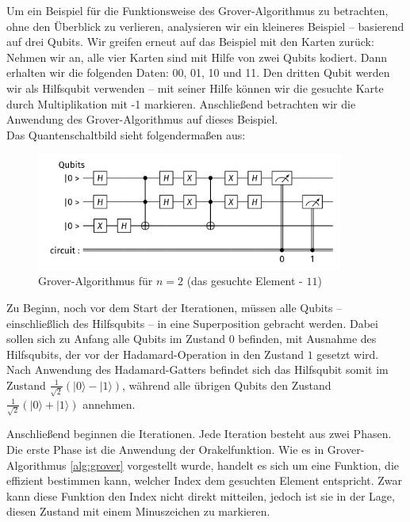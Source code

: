 Um ein Beispiel für die Funktionsweise des Grover-Algorithmus zu betrachten, ohne den Überblick zu verlieren, analysieren wir ein kleineres Beispiel – basierend auf drei Qubits. Wir greifen erneut auf das Beispiel mit den Karten zurück: Nehmen wir an, alle vier Karten sind mit Hilfe von zwei Qubits kodiert. Dann erhalten wir die folgenden Daten: 00, 01, 10 und 11. Den dritten Qubit werden wir als Hilfsqubit  verwenden – mit seiner Hilfe können wir die gesuchte Karte durch Multiplikation mit -1 markieren. Anschließend betrachten wir die Anwendung des Grover-Algorithmus auf dieses Beispiel.\\

Das Quantenschaltbild sieht folgendermaßen aus:
\begin{figure}[h!]
    \centering
    \includegraphics[width=0.9\textwidth]{images/basic-algorithms/3-qubits-grover.png}
    \caption{Grover-Algorithmus für $n=2$ (das gesuchte Element - $11$)}
    \label{fig:grover-three-bits}
\end{figure}

Zu Beginn, noch vor dem Start der Iterationen, müssen alle Qubits – einschließlich des Hilfsqubits – in eine Superposition gebracht werden. Dabei sollen sich zu Anfang alle Qubits im Zustand $0$ befinden, mit Ausnahme des Hilfsqubits, der vor der Hadamard-Operation in den Zustand $1$ gesetzt wird.\\

Nach Anwendung des Hadamard-Gatters befindet sich das Hilfsqubit somit im Zustand $\frac{1}{\sqrt{2}}(|0\rangle - |1\rangle)$, während alle übrigen Qubits den Zustand $\frac{1}{\sqrt{2}}(|0\rangle + |1\rangle)$ annehmen.

Anschließend beginnen die Iterationen. Jede Iteration besteht aus zwei Phasen. Die erste Phase ist die Anwendung der Orakelfunktion. Wie es in Grover-Algorithmus \ref{alg:grover} vorgestellt wurde, handelt es sich um eine Funktion, die effizient bestimmen kann, welcher Index dem gesuchten Element entspricht. Zwar kann diese Funktion den Index nicht direkt mitteilen, jedoch ist sie in der Lage, diesen Zustand mit einem Minuszeichen zu markieren.


